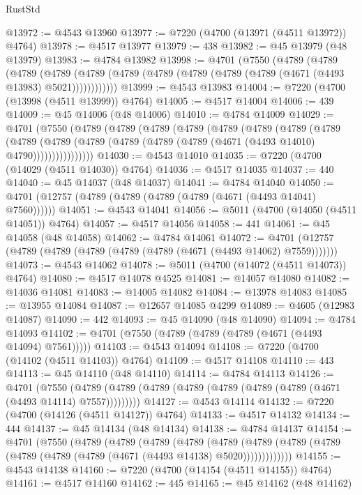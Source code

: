 \begin{lexlean}{RustStd}
\begin{coremodule}
@13972 := @4543 @13960
@13977 := @7220 (@4700 (@13971 (@4511 @13972)) @4764)
@13978 := @4517 @13977
@13979 := 438
@13982 := @45 @13979 (@48 @13979)
@13983 := @4784 @13982
@13998 := @4701
    (@7550
      (@4789
        (@4789
          (@4789
            (@4789 (@4789 (@4789 (@4789 (@4789 (@4789 (@4789 (@4671 (@4493 @13983) @5021))))))))))))
@13999 := @4543 @13983
@14004 := @7220 (@4700 (@13998 (@4511 @13999)) @4764)
@14005 := @4517 @14004
@14006 := 439
@14009 := @45 @14006 (@48 @14006)
@14010 := @4784 @14009
@14029 := @4701
    (@7550
      (@4789
        (@4789
          (@4789
            (@4789
              (@4789
                (@4789
                  (@4789
                    (@4789
                      (@4789
                        (@4789
                          (@4789 (@4789 (@4789 (@4789 (@4671 (@4493 @14010) @4790))))))))))))))))
@14030 := @4543 @14010
@14035 := @7220 (@4700 (@14029 (@4511 @14030)) @4764)
@14036 := @4517 @14035
@14037 := 440
@14040 := @45 @14037 (@48 @14037)
@14041 := @4784 @14040
@14050 := @4701 (@12757 (@4789 (@4789 (@4789 (@4789 (@4671 (@4493 @14041) @7560))))))
@14051 := @4543 @14041
@14056 := @5011 (@4700 (@14050 (@4511 @14051)) @4764)
@14057 := @4517 @14056
@14058 := 441
@14061 := @45 @14058 (@48 @14058)
@14062 := @4784 @14061
@14072 := @4701 (@12757 (@4789 (@4789 (@4789 (@4789 (@4789 (@4671 (@4493 @14062) @7559)))))))
@14073 := @4543 @14062
@14078 := @5011 (@4700 (@14072 (@4511 @14073)) @4764)
@14080 := @4517 @14078 @4525
@14081 := @14057 @14080
@14082 := @14036 @14081
@14083 := @14005 @14082
@14084 := @13978 @14083
@14085 := @13955 @14084
@14087 := @12657 @14085 @4299
@14089 := @4605 (@12983 @14087)
@14090 := 442
@14093 := @45 @14090 (@48 @14090)
@14094 := @4784 @14093
@14102 := @4701 (@7550 (@4789 (@4789 (@4789 (@4671 (@4493 @14094) @7561)))))
@14103 := @4543 @14094
@14108 := @7220 (@4700 (@14102 (@4511 @14103)) @4764)
@14109 := @4517 @14108
@14110 := 443
@14113 := @45 @14110 (@48 @14110)
@14114 := @4784 @14113
@14126 := @4701
    (@7550 (@4789 (@4789 (@4789 (@4789 (@4789 (@4789 (@4789 (@4671 (@4493 @14114) @7557)))))))))
@14127 := @4543 @14114
@14132 := @7220 (@4700 (@14126 (@4511 @14127)) @4764)
@14133 := @4517 @14132
@14134 := 444
@14137 := @45 @14134 (@48 @14134)
@14138 := @4784 @14137
@14154 := @4701
    (@7550
      (@4789
        (@4789
          (@4789
            (@4789
              (@4789
                (@4789 (@4789 (@4789 (@4789 (@4789 (@4789 (@4671 (@4493 @14138) @5020)))))))))))))
@14155 := @4543 @14138
@14160 := @7220 (@4700 (@14154 (@4511 @14155)) @4764)
@14161 := @4517 @14160
@14162 := 445
@14165 := @45 @14162 (@48 @14162)

\end{coremodule}
\end{lexlean}
